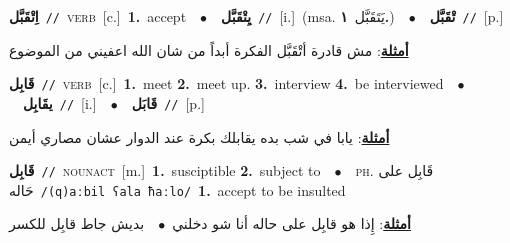 \documentclass[10pt,a4paper,twoside]{article} %
\begin{document}
\begin{multicols}{2}
{{{{{{{{{{{{\setlength\topsep{0pt}\textbf{\foreignlanguage{arabic}{اِتْقَبَّل}}\ {\color{gray}\texttt{//}\color{black}}\ \textsc{verb}\ [c.]\ \textbf{1.}~accept\ \ $\bullet$\ \ \setlength\topsep{0pt}\textbf{\foreignlanguage{arabic}{يِتْقَبَّل}}\ {\color{gray}\texttt{//}\color{black}}\ [i.]\ \color{gray}(msa. \foreignlanguage{arabic}{يَتَقَبَّل}~\foreignlanguage{arabic}{\textbf{١.}})\color{black}\ \ $\bullet$\ \ \setlength\topsep{0pt}\textbf{\foreignlanguage{arabic}{تْقَبَّل}}\ {\color{gray}\texttt{//}\color{black}}\ [p.]\  \begin{flushright}\color{gray}\foreignlanguage{arabic}{\textbf{\underline{\foreignlanguage{arabic}{أمثلة}}}: مش قادرة أتْقَبَّل الفكرة أبداً من شان الله اعفيني من الموضوع}\end{flushright}\color{black}} \vspace{2mm}

{\setlength\topsep{0pt}\textbf{\foreignlanguage{arabic}{قَابِل}}\ {\color{gray}\texttt{//}\color{black}}\ \textsc{verb}\ [c.]\ \textbf{1.}~meet  \textbf{2.}~meet up.  \textbf{3.}~interview  \textbf{4.}~be interviewed\ \ $\bullet$\ \ \setlength\topsep{0pt}\textbf{\foreignlanguage{arabic}{يقَابِل}}\ {\color{gray}\texttt{//}\color{black}}\ [i.]\ \ $\bullet$\ \ \setlength\topsep{0pt}\textbf{\foreignlanguage{arabic}{قَابَل}}\ {\color{gray}\texttt{//}\color{black}}\ [p.]\  \begin{flushright}\color{gray}\foreignlanguage{arabic}{\textbf{\underline{\foreignlanguage{arabic}{أمثلة}}}: يابا في شب بده يقابلك بكرة عند الدوار عشان مصاري أيمن}\end{flushright}\color{black}} \vspace{2mm}

{\setlength\topsep{0pt}\textbf{\foreignlanguage{arabic}{قَابِل}}\ {\color{gray}\texttt{//}\color{black}}\ \textsc{noun\textunderscore act}\ [m.]\ \textbf{1.}~susciptible  \textbf{2.}~subject to\ \ $\bullet$\ \ \textsc{ph.} \color{gray} \foreignlanguage{arabic}{قَابِل على حَاله}\color{black}\ {\color{gray}\texttt{/{\sffamily (q)aːbil ʕala ħaːlo}/}\color{black}}\ \textbf{1.}~accept to be insulted\  \begin{flushright}\color{gray}\foreignlanguage{arabic}{\textbf{\underline{\foreignlanguage{arabic}{أمثلة}}}: إِذا هو قابِل على حاله أنا شو دخلني\ $\bullet$\ \  بديش جاط قابِل للكسر}\end{flushright}\color{black}} \vspace{2mm}

}}}}}}}}}}}
\end{multicols}
\end{document}
